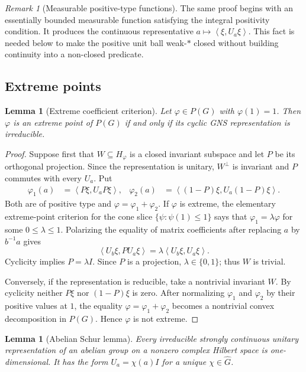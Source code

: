 \documentclass[11pt]{article}
\newtheorem{lemma}[theorem]{Lemma}
\theoremstyle{definition}
\theoremstyle{remark}
\newtheorem{remark}[theorem]{Remark}
\newcommand{\dual}[1]{\widehat{#1}}
\newcommand{\angles}[1]{\left\langle #1\right\rangle}
\begin{document}
\begin{remark}[Measurable positive-type functions]
\label{rem:positive-continuous-rep}
The same proof begins with an essentially bounded measurable function satisfying the
integral positivity condition.  It produces the continuous representative
$a\mapsto\angles{\xi,U_a\xi}$.  This fact is needed below to make the positive unit ball
weak-$*$ closed without building continuity into a non-closed predicate.
\end{remark}

\subsection{Extreme points}

\begin{lemma}[Extreme coefficient criterion]
\label{lem:extreme-irreducible}
Let $\varphi\in P(G)$ with $\varphi(1)=1$.  Then $\varphi$ is an extreme point of
$P(G)$ if and only if its cyclic GNS representation is irreducible.
\end{lemma}

\begin{proof}
Suppose first that $W\subseteq H_\varphi$ is a closed invariant subspace and let $P$ be
its orthogonal projection.  Since the representation is unitary, $W^\perp$ is invariant
and $P$ commutes with every $U_a$.  Put
\begin{align*}
 \varphi_1(a)&=\angles{P\xi,U_aP\xi},&
 \varphi_2(a)&=\angles{(1-P)\xi,U_a(1-P)\xi}.
\end{align*}
Both are of positive type and $\varphi=\varphi_1+\varphi_2$.  If $\varphi$ is extreme,
the elementary extreme-point criterion for the cone slice
$\{\psi:\psi(1)\leq1\}$ says that
$\varphi_1=\lambda\varphi$ for some $0\leq\lambda\leq1$.  Polarizing the equality of
matrix coefficients after replacing $a$ by $b^{-1}a$ gives
\[
 \angles{U_b\xi,PU_a\xi}=\lambda\angles{U_b\xi,U_a\xi}.
\]
Cyclicity implies $P=\lambda I$.  Since $P$ is a projection, $\lambda\in\{0,1\}$;
thus $W$ is trivial.

Conversely, if the representation is reducible, take a nontrivial invariant $W$.  By
cyclicity neither $P\xi$ nor $(1-P)\xi$ is zero.  After normalizing $\varphi_1$ and
$\varphi_2$ by their positive values at $1$, the equality
$\varphi=\varphi_1+\varphi_2$ becomes a nontrivial convex decomposition in $P(G)$.
Hence $\varphi$ is not extreme.
\end{proof}

\begin{lemma}[Abelian Schur lemma]
\label{lem:abelian-schur}
Every irreducible strongly continuous unitary representation of an abelian group on a
nonzero complex Hilbert space is one-dimensional.  It has the form
$U_a=\chi(a)I$ for a unique $\chi\in\dual G$.
\end{lemma}
\end{document}
